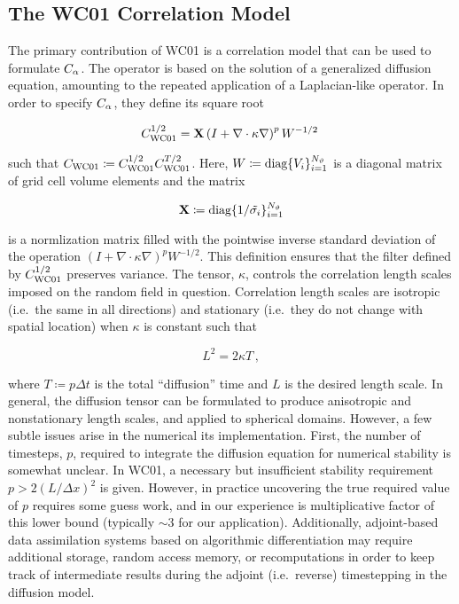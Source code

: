 \subsection{The WC01 Correlation Model}
\label{ssec:wc01_review}

The primary contribution of WC01 is a correlation model that can be used to
formulate $C_\alpha$.
The operator is based on the solution of a generalized diffusion equation,
amounting to the repeated application of a Laplacian-like operator.
In order to specify $C_\alpha$, they define its square root
\begin{linenomath*}\begin{equation}
    C^{1/2}_\text{WC01} = \mathbf{X}
        \left(I + \nabla\cdot\kappa\nabla \right)^p W^{-1/2} \,
\end{equation}\end{linenomath*}
such that
$C_\text{WC01} \coloneqq C_\text{WC01}^{1/2}C_\text{WC01}^{T/2}$.
Here, $W \coloneqq \text{diag}\{V_i\}_{i=1}^{N_{\vartheta}}$ is a diagonal matrix of
grid cell volume elements and the matrix
\begin{linenomath*}\begin{equation*}
    \mathbf{X} \coloneqq \text{diag}\{1/\tilde{\sigma_i}\}_{i=1}^{N_{\vartheta}}
\end{equation*}\end{linenomath*}
is a normlization matrix filled with the pointwise inverse standard deviation of the
operation $\left(I+\nabla\cdot\kappa\nabla \right)^p W^{-1/2}$.
This definition ensures that the filter defined by $C^{1/2}_\text{WC01}$
preserves variance.
The tensor, $\kappa$, controls the correlation length scales imposed on the
random field in question.
Correlation length scales are isotropic (i.e.\ the same in all directions) and
stationary (i.e.\ they do not change with spatial location) when $\kappa$ is
constant such that
\begin{linenomath*}\begin{equation*}
    L^2 = 2\kappa T \, ,
\end{equation*}\end{linenomath*}
where $T\coloneqq p \Delta t$ is the total ``diffusion'' time and $L$ is the
desired length scale.
In general, the diffusion tensor can be formulated to produce anisotropic and
nonstationary length scales, and applied to spherical domains.
However, a few subtle issues arise in the numerical its implementation.
First, the number of timesteps, $p$, required to integrate the diffusion
equation for numerical stability is somewhat unclear.
In WC01, a necessary but insufficient stability requirement
$p > 2 (L/\Delta x)^2$ is given.
However, in practice uncovering the true required value of $p$ requires some
guess work, and in our experience is multiplicative factor of this lower bound
(typically $\sim 3$ for our application).
Additionally, adjoint-based data assimilation systems based on algorithmic
differentiation may require additional storage, random access memory, or recomputations in order
to keep track of intermediate results during the adjoint (i.e.\ reverse) timestepping
in the diffusion model.

